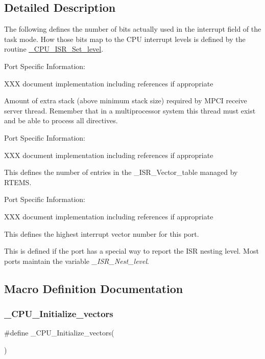 \subsection{Detailed Description}
The following defines the number of bits actually used in the interrupt field of the task mode. How those bits map to the C\+PU interrupt levels is defined by the routine \mbox{\hyperlink{group__RTEMSScoreCPUARM_ga43820ba3d51d7a699c22fce8cac93ef1}{\+\_\+\+C\+P\+U\+\_\+\+I\+S\+R\+\_\+\+Set\+\_\+level}}.

Port Specific Information\+:

X\+XX document implementation including references if appropriate

Amount of extra stack (above minimum stack size) required by M\+P\+CI receive server thread. Remember that in a multiprocessor system this thread must exist and be able to process all directives.

Port Specific Information\+:

X\+XX document implementation including references if appropriate

This defines the number of entries in the \+\_\+\+I\+S\+R\+\_\+\+Vector\+\_\+table managed by R\+T\+E\+MS.

Port Specific Information\+:

X\+XX document implementation including references if appropriate

This defines the highest interrupt vector number for this port.

This is defined if the port has a special way to report the I\+SR nesting level. Most ports maintain the variable {\itshape \+\_\+\+I\+S\+R\+\_\+\+Nest\+\_\+level}. 

\subsection{Macro Definition Documentation}
\mbox{\label{group__RTEMSScoreCPUBfinCPUInterrupt_gad1ef5062849284d81496e1e6d33fb7ff}} 
\subsubsection{\texorpdfstring{\_CPU\_Initialize\_vectors}{\_CPU\_Initialize\_vectors}}
{\footnotesize\ttfamily \#define \+\_\+\+C\+P\+U\+\_\+\+Initialize\+\_\+vectors(\begin{DoxyParamCaption}{ }\end{DoxyParamCaption})}

